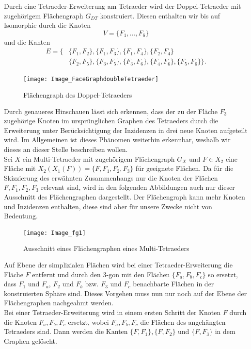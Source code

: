 \documentclass[12pt,titlepage,twoside,cleardoublepage]{article}
\theoremstyle{nummermitklammern}
\numberwithin{equation}{section}
\begin{document}
Durch eine Tetraeder-Erweiterung am Tetraeder wird der Doppel-Tetraeder mit zugehörigem Flächengraph $G_{DT}$ konstruiert. Diesen enthalten wir bis auf Isomorphie durch die Knoten 
\[
V=\{F_1,\ldots,F_6\}
\]
 und die Kanten 
\begin{align*}
E=\{&\{F_1,F_2\},\{F_1,F_3\},\{F_1,F_4\},\{F_2,F_4\}\\
&\{F_2,F_5\},\{F_3,F_5\},\{F_3,F_6\},\{F_4,F_6\},\{F_5,F_6\}\}.
\end{align*}
\begin{figure}[H]
\begin{center}
\texttt{[image: Image\_FaceGraphdoubleTetraeder]}
\end{center}
\caption{Flächengraph des Doppel-Tetraeders}
\end{figure}
Durch genaueres Hinschauen lässt sich erkennen, dass der zu der Fläche $F_3$ zugehörige Knoten im ursprünglichen Graphen des Tetraeders durch die Erweiterung unter Berücksichtigung der Inzidenzen in drei neue Knoten aufgeteilt wird. Im Allgemeinen ist dieses Phänomen weiterhin erkennbar, weshalb wir dieses an dieser Stelle beschreiben wollen.\\
Sei $X$ ein Multi-Tetraeder mit zugehörigem Flächengraph $G_X$ und $F\in X_2$ eine Fläche mit $X_2(X_1(F))=\{F,F_1,F_2,F_3\}$ für geeignete Flächen. 
Da für die Skizzierung des erwähnten Zusammenhangs nur die Knoten der Flächen $F,F_1,F_2,F_3$ relevant sind, wird in den folgenden Abbildungen auch nur dieser Ausschnitt des Flächengraphen dargestellt. Der Flächengraph kann mehr Knoten und Inzidenzen enthalten, diese sind aber für unsere Zwecke nicht von Bedeutung.
\begin{figure}[H]
\begin{center}
\texttt{[image: Image\_fg1]}
\end{center}
\caption{Ausschnitt eines Flächengraphen eines Multi-Tetraeders}
\end{figure}
Auf Ebene der simplizialen Flächen wird bei einer Tetraeder-Erweiterung die Fläche $F$ entfernt und durch den 3-gon mit den Flächen $\{F_a,F_b,F_c\}$ so ersetzt, dass $F_1$ und $F_a$, $F_2$ und $F_b$ bzw. $F_3$ und $F_c$ benachbarte Flächen in der konstruierten Sphäre sind. Dieses Vorgehen muss nun nur noch auf der Ebene der Flächengraphen nachgeahmt werden.\\
Bei einer Tetraeder-Erweiterung wird in einem ersten Schritt der Knoten $F$ durch die Knoten $F_a,F_b,F_c$ ersetzt, wobei $F_a,F_b,F_c$ die Flächen des angehängten Tetraeders sind. Dann werden die Kanten $\{F,F_1\},\{F,F_2\}$ und $\{F,F_3\}$ in dem Graphen gelöscht.
\end{document}
